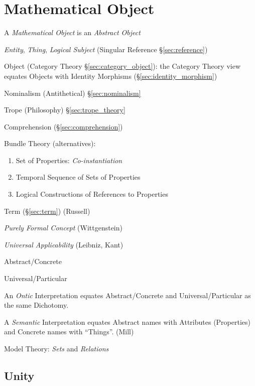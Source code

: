 \section{Mathematical Object}\label{sec:mathematical_object}
\cite{laycock10}

A \emph{Mathematical Object} is an \emph{Abstract Object}

\emph{Entity}, \emph{Thing}, \emph{Logical Subject} (Singular
Reference \S\ref{sec:reference})

Object (Category Theory \S\ref{sec:category_object}): the Category
Theory view equates Objects with Identity Morphisms
(\S\ref{sec:identity_morphism})

Nominalism (Antithetical) \S\ref{sec:nominalism}

Trope (Philosophy) \S\ref{sec:trope_theory}

Comprehension (\S\ref{sec:comprehension})

Bundle Theory (alternatives):
\begin{enumerate}
  \item Set of Properties: \emph{Co-instantiation}
  \item Temporal Sequence of Sets of Properties
  \item Logical Constructions of References to Properties
\end{enumerate}

Term (\S\ref{sec:term}) (Russell)

\emph{Purely Formal Concept} (Wittgenstein)

\emph{Universal Applicability} (Leibniz, Kant)

Abstract/Concrete

Universal/Particular

An \emph{Ontic} Interpretation equates Abstract/Concrete and
Universal/Particular as the same Dichotomy.

A \emph{Semantic} Interpretation equates Abstract names with
Attributes (Properties) and Concrete names with ``Things''. (Mill)

Model Theory: \emph{Sets} and \emph{Relations}



\subsection{Unity}\label{sec:unity}

